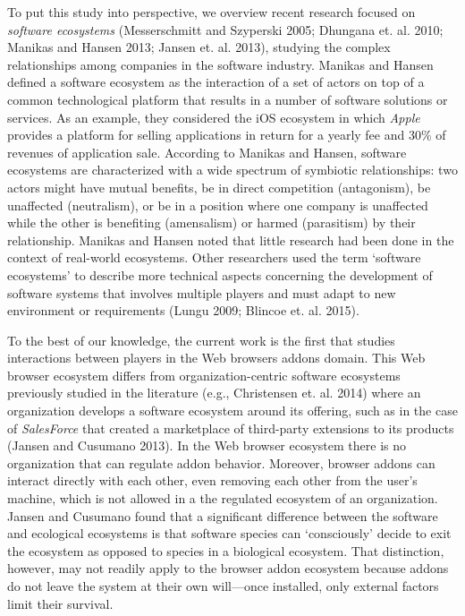 \documentclass{article} %
\begin{document}
To put this study into perspective, we overview recent research focused on \textit{software ecosystems} (Messerschmitt and Szyperski 2005; Dhungana et. al. 2010; Manikas and Hansen 2013; Jansen et. al. 2013), studying the complex relationships among companies in the software industry. Manikas and Hansen defined a software ecosystem as the interaction of a set of actors on top of a common technological platform that results in a number of software solutions or services. As an example, they considered the iOS ecosystem in which \textit{Apple }provides a platform for selling applications in return for a yearly fee and 30\% of revenues of application sale. According to Manikas and Hansen, software ecosystems are characterized with a wide spectrum of symbiotic relationships: two actors might have mutual benefits, be in direct competition (antagonism), be unaffected (neutralism), or be in a position where one company is unaffected while the other is benefiting (amensalism) or harmed (parasitism) by their relationship. Manikas and Hansen noted that little research had been done in the context of real-world ecosystems. Other researchers used the term `software ecosystems' to describe more technical aspects concerning the development of software systems that involves multiple players and must adapt to new environment or requirements (Lungu 2009; Blincoe et. al. 2015). 

To the best of our knowledge, the current work is the first that studies interactions between players in the Web browsers addons domain. This Web browser ecosystem differs from organization-centric software ecosystems previously studied in the literature (e.g., Christensen et. al. 2014) where an organization develops a software ecosystem around its offering, such as in the case of \textit{SalesForce} that created a marketplace of third-party extensions to its products (Jansen and Cusumano 2013). In the Web browser ecosystem there is no organization that can regulate addon behavior. Moreover, browser addons can interact directly with each other, even removing each other from the user's machine, which is not allowed in a the regulated ecosystem of an organization. Jansen and Cusumano found that a significant difference between the software and ecological ecosystems is that software species can `consciously' decide to exit the ecosystem as opposed to species in a biological ecosystem. That distinction, however, may not readily apply to the browser addon ecosystem because addons do not leave the system at their own will---once installed, only external factors limit their survival. 
\end{document}

